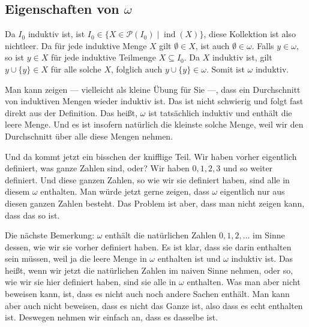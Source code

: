\subsection{Eigenschaften von \texorpdfstring{$\omega$}{omega}}
\begin{math-stroke}
\begin{short-proof}
Da $I_0$ induktiv ist, ist $I_0 \in \{ X \in \mathcal{P}(I_0) \mid \operatorname{ind}(X) \}$, diese Kollektion ist also nichtleer. Da für jede induktive Menge $X$ gilt $\emptyset \in X$, ist auch $\emptyset \in \omega$.
Falls $y \in \omega$, so ist $y \in X$ für jede induktive Teilmenge $X \subseteq I_0$. Da $X$ induktiv ist, gilt $y \cup \{y\} \in X$ für alle solche $X$, folglich auch $y \cup \{y\} \in \omega$. Somit ist $\omega$ induktiv.
\end{short-proof}
\end{math-stroke}

\begin{spoken-clean}[00:47:57 - 00:49:23]
Man kann zeigen --- vielleicht als kleine Übung für Sie ---, dass ein Durchschnitt von induktiven Mengen wieder induktiv ist. Das ist nicht schwierig und folgt fast direkt aus der Definition. Das heißt, $\omega$ ist tatsächlich induktiv und enthält die leere Menge. Und es ist insofern natürlich die kleinste solche Menge, weil wir den Durchschnitt über alle diese Mengen nehmen.
\end{spoken-clean}

\begin{spoken-clean}[00:49:23 - 00:51:19]
Und da kommt jetzt ein bisschen der knifflige Teil. Wir haben vorher eigentlich definiert, was ganze Zahlen sind, oder? Wir haben $0, 1, 2, 3$ und so weiter definiert. Und diese ganzen Zahlen, so wie wir sie definiert haben, sind alle in diesem $\omega$ enthalten. Man würde jetzt gerne zeigen, dass $\omega$ eigentlich nur aus diesen ganzen Zahlen besteht. Das Problem ist aber, dass man nicht zeigen kann, dass das so ist.

Die nächste Bemerkung: $\omega$ enthält die natürlichen Zahlen $0, 1, 2, \dots$ im Sinne dessen, wie wir sie vorher definiert haben. Es ist klar, dass sie darin enthalten sein müssen, weil ja die leere Menge in $\omega$ enthalten ist und $\omega$ induktiv ist. Das heißt, wenn wir jetzt die natürlichen Zahlen im naiven Sinne nehmen, oder so, wie wir sie hier definiert haben, sind sie alle in $\omega$ enthalten. Was man aber nicht beweisen kann, ist, dass es nicht auch noch andere Sachen enthält. Man kann aber auch nicht beweisen, dass es nicht das Ganze ist, also dass es echt enthalten ist. Deswegen nehmen wir einfach an, dass es dasselbe ist.
\end{spoken-clean}

